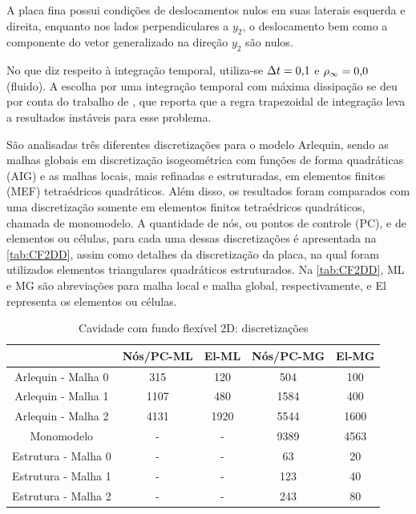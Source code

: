 A placa fina possui condições de deslocamentos nulos em suas laterais esquerda e direita, enquanto nos lados perpendiculares a $y_2$, o deslocamento bem como a componente do vetor generalizado na direção $y_2$ são nulos.

No que diz respeito à integração temporal, utiliza-se $\Delta t = 0\text{,}1$ e $\rho_\infty = 0\text{,}0$ (fluido). A escolha por uma integração temporal com máxima dissipação se deu por conta do trabalho de , que reporta que a regra trapezoidal de integração leva a resultados instáveis para esse problema.

São analisadas três diferentes discretizações para o modelo Arlequin, sendo as malhas globais em discretização isogeométrica com funções de forma quadráticas (AIG) e as malhas locais, mais refinadas e estruturadas, em elementos finitos (MEF) tetraédricos quadráticos. Além disso, os resultados foram comparados com uma discretização somente em elementos finitos tetraédricos quadráticos, chamada de monomodelo. A quantidade de nós, ou pontos de controle (PC), e de elementos ou células, para cada uma dessas discretizações é apresentada na \autoref{tab:CF2DD}, assim como detalhes da discretização da placa, na qual foram utilizados elementos triangulares quadráticos estruturados. Na \autoref{tab:CF2DD}, ML e MG são abreviações para malha local e malha global, respectivamente, e El representa os elementos ou células.

\begin{center}
	\begin{table}[!htbp]
		\caption{Cavidade com fundo flexível 2D: discretizações}
		\centering
		\begin{tabular}{ccccc} 
			\toprule
			\ &  Nós/PC-ML & El-ML & Nós/PC-MG & El-MG  \\ 
			\midrule \midrule
			Arlequin - Malha 0 & 315 & 120 & 504 & 100 \\ 
			\midrule
			Arlequin - Malha 1 & 1107 & 480 & 1584 & 400\\
			\midrule
			Arlequin - Malha 2 & 4131 & 1920 & 5544 & 1600\\
			\midrule
			Monomodelo & - & - & 9389 & 4563\\
			\midrule
			Estrutura - Malha 0 & - & - &  63 & 20\\
			\midrule
			Estrutura - Malha 1 & - & - &  123 & 40\\
			\midrule
			Estrutura - Malha 2 & - & - &  243 & 80 \\
			\midrule
		\end{tabular}
		\label{tab:CF2DD}
	\end{table}
\end{center}


